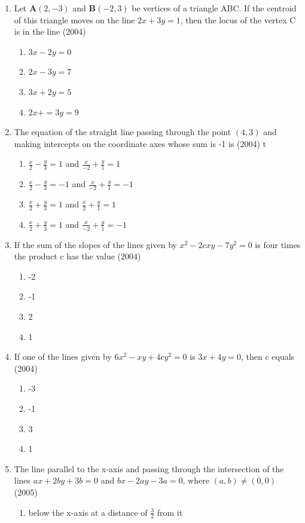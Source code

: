 \documentclass[12pt]{article}
\let\vec\mathbf
\begin{document}
\begin{enumerate}
\begin{enumerate}
\end{enumerate}
\item Let $\vec{A}(2,-3)$ and $\vec{B}(-2,3)$ be vertices of a triangle ABC. If the centroid of this triangle moves on the line $2x+3y=1$, then the locus of the vertex C is in the line  (2004)
\begin{enumerate}
\item $3x-2y=0$
\item $2x-3y=7$ 
\item $3x+2y=5$ 
\item $2x+=3y=9$
\end{enumerate}
\item The equation of the straight line passing through the point $(4,3)$ and making intercepts on the coordinate axes whose sum is -1 is (2004)
t\begin{enumerate}
\item $\frac{x}{2}-\frac{y}{3}=1$ and $\frac{x}{-2}+\frac{y}{1}=1$
\item $\frac{x}{2}-\frac{y}{3}=-1$ and $\frac{x}{-2}+\frac{y}{1}=-1$
\item $\frac{x}{2}+\frac{y}{3}=1$ and $\frac{x}{2}+\frac{y}{1}=1$
\item $\frac{x}{2}+\frac{y}{3}=1$ and $\frac{x}{-2}+\frac{y}{1}=-1$
\end{enumerate}
\item If the sum of the slopes of the lines given by $x^2-2cxy-7y^2=0$ is four times the product c has the value (2004)
\begin{enumerate}
\item -2 
\item -1 
\item  2 
\item  1
\end{enumerate}
\item If one of the lines given by $6x^2-xy+4cy^2=0$ is $3x+4y=0$, then c equals (2004)
\begin{enumerate}
\item -3 
\item -1 
\item  3 
\item  1
\end{enumerate}
\item The line parallel to the x-axis and passing through the intersection of the lines $ax+2by+3b=0$ and $bx-2ay-3a=0$, where $(a,b) \neq (0,0)$ (2005)
\begin{enumerate}
\item below the x-axis at a distance of $\frac{3}{2}$ from it

\end{enumerate}
\end{enumerate}
\end{document}
